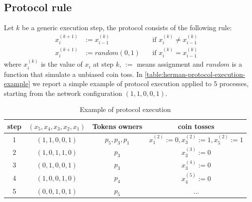 \subsection{Protocol rule}

Let $k$ be a generic execution step, the protocol consists of the
following rule:
\begin{displaymath}
  \begin{split}
    x_{i}^{(k+1)} &:= x_{i-1}^{(k)} \quad &\text{if } x_{i}^{(k)} \not=
    x_{i-1}^{(k)}\\
    x_{i}^{(k+1)} &:= random(0,1) \quad &\text{if } x_{i}^{(k)} =
    x_{i-1}^{(k)}
  \end{split}
\end{displaymath}
where $x_{i}^{(k)}$ is the value of $x_i$ at step $k$, $:=$ means
assignment and $random$ is a function that simulate a unbiased coin
toss. In \autoref{table:herman-protocol-execution-example} we report a
simple example of protocol execution applied to 5 processes, starting
from the network configuration $(1, 1, 0, 0, 1)$.
\begin{table}[ht]
  \begin{center}
    \begin{tabular}{cccc}
      \hline
      step & $(x_5, x_4, x_3, x_2, x_1)$ & Tokens owners & coin tosses \\ 
      \hline     
      1 & $(1, 1, 0, 0, 1)$ & $p_5, p_3, p_1$ & $x_1^{(2)}:= 0,
      x_3^{(2)}:= 1, x_5^{(2)}:= 1$  \\
      2 & $(1, 0, 1, 1, 0)$ & $p_3$ & $x_3^{(3)}:= 0$  \\
      3 & $(0, 1, 0, 0, 1)$ & $p_3$ & $x_3^{(4)}:= 0$  \\
      4 & $(1, 0, 0, 1, 0)$ & $p_4$ & $x_4^{(5)}:= 0$  \\
      5 & $(0, 0, 1, 0, 1)$ & $p_5$ & $\ldots$  \\ 
      \hline
    \end{tabular}
    \caption{Example of protocol execution}
    \label{table:herman-protocol-execution-example}
  \end{center}
\end{table}

